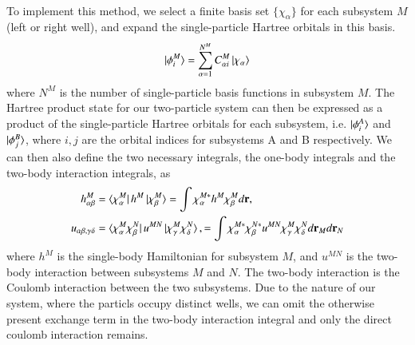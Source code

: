 \documentclass{subfiles}
\begin{document}
\\
To implement this method, we select a finite basis set $\{\chi_\alpha\}$ for each subsystem $M$ (left or right well), and expand the single-particle Hartree orbitals in this basis. 
\begin{align*}
    \ket{\phi^M_i} = \sum_{\alpha=1}^{N^M} C^M_{\alpha i}\ket{\chi_\alpha}
\end{align*}
where $N^M$ is the number of single-particle basis functions in subsystem $M$. The Hartree product state for our two-particle system can then be expressed as a product of the single-particle Hartree orbitals for each subsystem, i.e. $\ket{\phi^A_i}$ and $\ket{\phi^B_j}$, where $i,j$ are the orbital indices for subsystems A and B respectively. We can then also define the two necessary integrals, the one-body integrals and the two-body interaction integrals, as
\begin{align*}
    h_{\alpha\beta}^M &= \bra{\chi_\alpha^M}h^M\ket{\chi_\beta^M} = \int \chi_\alpha^{M*} h^M\chi_\beta^M d\mathbf{r},\\
    u_{\alpha\beta,\gamma\delta} &= \bra{\chi_\alpha^M\chi_\beta^N}u^{MN}\ket{\chi_\gamma^M\chi_\delta^N}, = \int \chi_\alpha^{M*}\chi_\beta^{N*} u^{MN} \chi_\gamma^M\chi_\delta^N d\mathbf{r}_M d\mathbf{r}_N
\end{align*}
where $h^M$ is the single-body Hamiltonian for subsystem $M$, and $u^{MN}$ is the two-body interaction between subsystems $M$ and $N$. The two-body interaction is the Coulomb interaction between the two subsystems. Due to the nature of our system, where the particls occupy distinct wells, we can omit the otherwise present exchange term in the two-body interaction integral and only the direct coulomb interaction remains. \\
\end{document}
